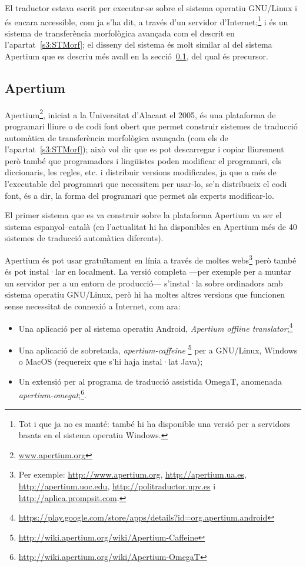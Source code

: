 El traductor estava escrit per executar-se sobre el sistema operatiu
GNU/Linux i és encara accessible, com ja s'ha dit, a través d'un
servidor d'Internet;\footnote{Tot i que ja no es manté: també hi ha
  disponible una versió per a servidors basats en el sistema operatiu
  Windows.} i és un sistema de transferència morfològica avançada com
el descrit en l'apartat~\ref{s3:STMorf}; el disseny del sistema és
molt similar al del sistema Apertium que es descriu més avall en la
secció~\ref{ss:apertium}, del qual és precursor.

\subsection{Apertium}
\label{ss:apertium}

Apertium\footnote{\url{www.apertium.org}}, iniciat a la Universitat
d'Alacant el 2005, és una plataforma de programari lliure o de codi
font obert que permet construir sistemes de traducció automàtica de
transferència morfològica avançada (com els de
l'apartat~\ref{s3:STMorf}); això vol dir que es pot descarregar i
copiar lliurement però també que programadors i lingüistes poden
modificar el programari, els diccionaris, les regles, etc. i
distribuir versions modificades, ja que a més de l'executable del
programari que necessitem per usar-lo, se'n distribueix el codi font,
és a dir, la forma del programari que permet als experts modificar-lo.

El primer sistema que es va construir sobre la plataforma Apertium va
ser el sistema espanyol--català (en l'actualitat hi ha disponibles en
Apertium més de 40 sistemes de traducció automàtica diferents).

Apertium és pot usar gratuïtament en línia a través de moltes
webs\footnote{Per exemple: \url{http://www.apertium.org},
  \url{http://apertium.ua.es}, \url{http://apertium.uoc.edu},
  \url{http://politraductor.upv.es} i
  \url{http://aplica.prompsit.com}.} però també és pot instal·lar en
localment. La versió completa ---per exemple per a muntar un servidor
per a un entorn de producció--- s'instal·la sobre ordinadors amb sistema
operatiu GNU/Linux, però hi ha moltes altres versions que funcionen sense necessitat de connexió a Internet, com ara:
\begin{itemize}
\item Una aplicació per al sistema operatiu Android, \emph{Apertium
    offline
    translator};\footnote{\url{https://play.google.com/store/apps/details?id=org.apertium.android}}
\item Una aplicació de sobretaula, \emph{apertium-caffeine}
  \footnote{\url{http://wiki.apertium.org/wiki/Apertium-Caffeine}} per
  a GNU/Linux, Windows o MacOS (requereix que s'hi haja instal·lat
  Java);
\item Un extensió per al programa de traducció assistida OmegaT, anomenada \emph{apertium-omegat};\footnote{\url{http://wiki.apertium.org/wiki/Apertium-OmegaT}}.
\end{itemize}


